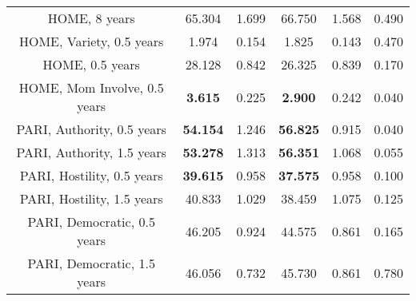 \begin{tabular}{c c c c c c}
HOME, 8 years & 65.304 & 1.699 &  66.750 & 1.568 & 0.490 \\
HOME, Variety, 0.5 years & 1.974 & 0.154 &  1.825 & 0.143 & 0.470 \\
HOME, 0.5 years & 28.128 & 0.842 &  26.325 & 0.839 & 0.170 \\
HOME, Mom Involve, 0.5 years & \textbf{3.615} & 0.225 &  \textbf{2.900} & 0.242 & 0.040 \\
PARI, Authority, 0.5 years & \textbf{54.154} & 1.246 &  \textbf{56.825} & 0.915 & 0.040 \\
PARI, Authority, 1.5 years & \textbf{53.278} & 1.313 &  \textbf{56.351} & 1.068 & 0.055 \\
PARI, Hostility, 0.5 years & \textbf{39.615} & 0.958 &  \textbf{37.575} & 0.958 & 0.100 \\
PARI, Hostility, 1.5 years & 40.833 & 1.029 &  38.459 & 1.075 & 0.125 \\
PARI, Democratic, 0.5 years & 46.205 & 0.924 &  44.575 & 0.861 & 0.165 \\
PARI, Democratic, 1.5 years & 46.056 & 0.732 &  45.730 & 0.861 & 0.780 \\
\bottomrule
\end{tabular}
